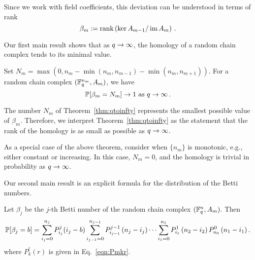 
Since we work with field coefficients, this deviation can
be understood in terms of rank
\begin{equation}
  \beta_m := \mathrm{rank} \left(\ker A_{m-1} / \operatorname{\mathrm{im}} A_m \right)\, .
  \label{eqn:betti_numbers}
\end{equation}

Our first main result shows that as $q \rightarrow \infty$, the homology of a 
random chain complex tends to its minimal value.

\begin{bigthm}
  \label{thm:qtoinfty}
  Set $N_m = \max(0,n_m - \min(n_{m},n_{m-1}) - \min(n_m,n_{m+1}))$. 
  For a random chain complex $(\mathbb{F}_q^{n_m},A_m)$, we have
  \[
    \mathbb{P}[\beta_m = N_m] \rightarrow 1 
    \mbox{ as } q \rightarrow \infty  \, .
  \]
\end{bigthm}

\begin{remark}
  \label{rem:smallest}
  The number $N_m$ of Theorem~\ref{thm:qtoinfty} represents the smallest
  possible value of $\beta_m$. Therefore, we interpret Theorem~\ref{thm:qtoinfty}
  as the statement that the rank of the homology is as small as possible as 
  $q \rightarrow \infty$.
\end{remark}

\begin{remark}
  \label{rem:monotone}
  As a special case of the above theorem, consider when $\{n_m\}$
  is monotonic, e.g., either constant or increasing. In this case, 
  $N_m = 0$, and the homology is trivial in probability as $q \rightarrow \infty$.
\end{remark}


Our second main result is an explicit formula for the distribution
of the Betti numbers.
\begin{bigthm} 
  \label{thm:bettinum}
  Let $\beta_j$ be the $j$-th Betti number of the random chain complex
  $(\mathbb{F}_q^{n} , A_m)$. Then
  \[    
    \mathbb{P}[\beta_j = b] = \sum_{i_j=0}^{n_{j}} P_{i_j}^{j}(i_j-b)
    \sum_{i_{j-1}=0}^{n_{j-1}} P_{i_{j-1}}^{j-1}\left(n_{j} -i_j\right) \cdots
    \sum_{i_1 = 0}^{n_1} P_{i_1}^1\left(n_2 - i_2\right) P_{n_0}^0 \left(n_1 - i_1\right).
  \]
  where $P^l_k(r)$ is given in Eq.~\eqref{eqn:Pmkr}.
\end{bigthm}

